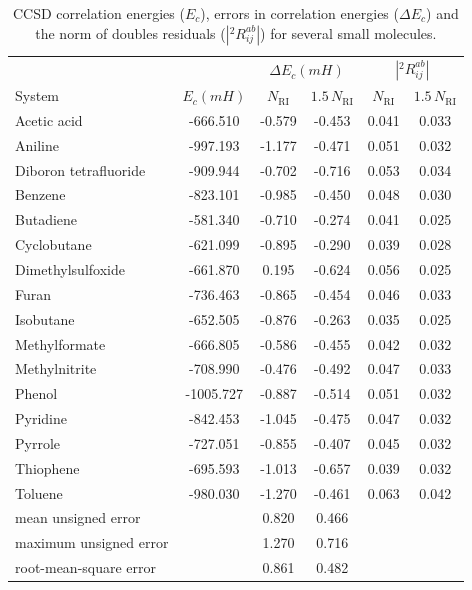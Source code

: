 \begin{center}
\begin{table}[!ht]
\caption{CCSD correlation energies ($E_c$), errors in
correlation energies ($\Delta E_c$) 
and the norm of doubles residuals ($|{}^2R_{ij}^{ab}|$) for several small 
molecules.
\label{tab:energies_thc_rccsd}}
\begin{tabular}{lccccc}
\hline \hline
& & \multicolumn{2}{c}{$\Delta E_c (mH)$} & 
\multicolumn{2}{c}{$|{}^2R_{ij}^{ab}|$}\\
\cline{3-4} \cline{5-6} System & $E_c (mH)$ & $N_\mathrm{RI}$ &
$1.5 \, N_\mathrm{RI}$ & $N_\mathrm{RI}$ &
$1.5 \, N_\mathrm{RI}$\\
\hline
Acetic acid & -666.510 & -0.579 & -0.453 & 0.041 & 0.033 \\
Aniline & -997.193 & -1.177 & -0.471 & 0.051 & 0.032 \\
Diboron tetrafluoride & -909.944 & -0.702 & -0.716 & 0.053 & 0.034\\
Benzene & -823.101 & -0.985 & -0.450 & 0.048 & 0.030\\
Butadiene & -581.340 & -0.710 & -0.274 & 0.041 & 0.025\\
Cyclobutane & -621.099 & -0.895 & -0.290 & 0.039 & 0.028\\
Dimethylsulfoxide & -661.870 & 0.195 & -0.624 & 0.056 & 0.025\\
Furan & -736.463 & -0.865 & -0.454 & 0.046 & 0.033\\
Isobutane & -652.505 & -0.876 & -0.263 & 0.035 & 0.025\\
Methylformate & -666.805 & -0.586 & -0.455 & 0.042 & 0.032\\
Methylnitrite & -708.990 & -0.476 & -0.492 & 0.047 & 0.033\\
Phenol & -1005.727 & -0.887 & -0.514 & 0.051 & 0.032\\
Pyridine & -842.453 & -1.045 & -0.475 & 0.047 & 0.032\\
Pyrrole & -727.051 & -0.855 & -0.407 & 0.045 & 0.032\\
Thiophene & -695.593 & -1.013 & -0.657 & 0.039 & 0.032\\
Toluene & -980.030 & -1.270 & -0.461 & 0.063 & 0.042\\
\hline
mean unsigned error & & 0.820 & 0.466 & &\\
maximum unsigned error & & 1.270 & 0.716 & &\\
root-mean-square error & & 0.861 & 0.482 & &\\
\hline\hline
\end{tabular}
\end{table}
\end{center}
